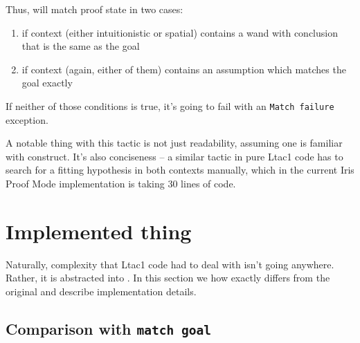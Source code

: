 Thus,  will match proof state in two cases:
\begin{enumerate}
\item if context (either intuitionistic or spatial) contains a wand with conclusion that is the same as the goal
\item if context (again, either of them) contains an assumption which matches the goal exactly
\end{enumerate}

If neither of those conditions is true, it's going to fail with an \texttt{Match failure} exception.

A notable thing with this tactic is not just readability, assuming one is familiar with  construct.
It's also conciseness -- a similar tactic in pure Ltac1 code has to search for a fitting hypothesis in both contexts manually, which in the current Iris Proof Mode implementation is taking 30 lines of code.

\section{Implemented thing}

Naturally, complexity that Ltac1 code had to deal with isn't going anywhere.
Rather, it is abstracted into .
In this section we how exactly  differs from the original  and describe implementation details.

\subsection{Comparison with \texttt{match goal}}

